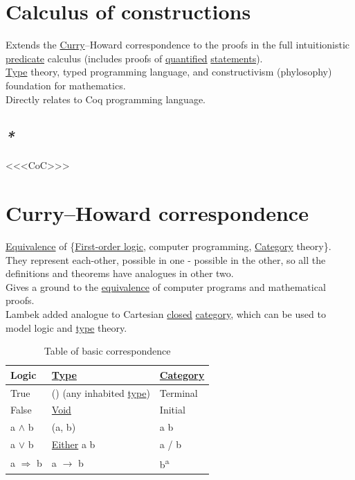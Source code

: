 \documentclass[a4paper,14pt,oneside]{book}
\begin{document}
\section{\label{org14de08c}Calculus of constructions}
\label{sec:org17bc9c8}
Extends the \hyperref[orgf69b894]{Curry}–Howard correspondence to the proofs in the full intuitionistic \hyperref[orgae082b4]{predicate} calculus (includes proofs of \hyperref[orgf5d85a3]{quantified} \hyperref[orgfd3e439]{statements}).\\
\hyperref[org6ce6dd7]{Type} theory, typed programming language, and constructivism (phylosophy) foundation for mathematics.\\
Directly relates to Coq programming language.\\

\subsection{\emph{*}}
\label{sec:orgb200841}

<<<\label{org1efb613}CoC>>>\\

\section{\label{org7430a6b}Curry–Howard correspondence}
\label{sec:orgddf1589}
\hyperref[org07e9336]{Equivalence} of \{\hyperref[org6bea987]{First-order logic}, computer programming, \hyperref[org4c4e70a]{Category} theory\}. They represent each-other, possible in one - possible in the other, so all the definitions and theorems have analogues in other two.\\

Gives a ground to the \hyperref[org07e9336]{equivalence} of computer programs and mathematical proofs.\\

Lambek added analogue to Cartesian \hyperref[org23314fd]{closed} \hyperref[org4c4e70a]{category}, which can be used to model logic and \hyperref[org6ce6dd7]{type} theory.\\

\begin{table}[htbp]
\caption{\label{tab--table-of-basic-correspondence}Table of basic correspondence}
\centering
\begin{tabular}{lll}
Logic & \hyperref[org6ce6dd7]{Type} & \hyperref[org4c4e70a]{Category}\\
\hline
True & () (any inhabited \hyperref[org6ce6dd7]{type}) & Terminal\\
False & \hyperref[orge1aee33]{Void} & Initial\\
a \(\land\) b & (a, b) & a \texttimes{} b\\
a \(\lor\) b & \hyperref[orgff4acda]{Either} a b & a /     b\\
a \(\Rightarrow\) b & a \(\to\) b & b\textsuperscript{a}\\
\end{tabular}
\end{table}
\end{document}
